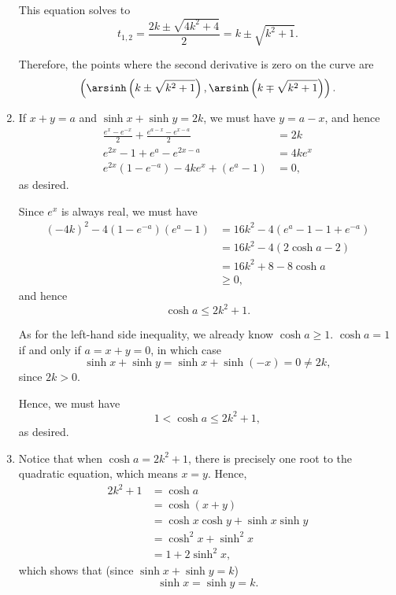 \begin{enumerate}
          This equation solves to
          \[
              t_{1, 2} = \frac{2k \pm \sqrt{4k^2 + 4}}{2} = k \pm \sqrt{k^2 + 1}.
          \]

          Therefore, the points where the second derivative is zero on the curve are
          \[
              \left(\arsinh \left(k \pm \sqrt{k^2 + 1}\right), \arsinh \left(k \mp \sqrt{k^2 + 1}\right)\right).
          \]

    \item If \(x + y = a\) and \(\sinh x + \sinh y = 2k\), we must have \(y = a - x\), and hence
          \begin{align*}
              \frac{e^x - e^{-x}}{2} + \frac{e^{a - x} - e^{x - a}}{2} & = 2k       \\
              e^{2x} - 1 + e^a - e^{2x - a}                            & = 4k e^{x} \\
              e^{2x} (1 - e^{-a}) - 4k e^{x} + (e^a - 1)               & = 0,
          \end{align*}
          as desired.

          Since \(e^x\) is always real, we must have
          \begin{align*}
              (-4k)^2 - 4 (1 - e^{-a})(e^a - 1) & = 16k^2 - 4 (e^a - 1 - 1 + e^{-a}) \\
                                                & = 16k^2 - 4 (2 \cosh a - 2)        \\
                                                & = 16k^2 + 8 - 8 \cosh a            \\
                                                & \geq 0,
          \end{align*}
          and hence
          \[
              \cosh a \leq 2k^2 + 1.
          \]

          As for the left-hand side inequality, we already know \(\cosh a \geq 1\). \(\cosh a = 1\) if and only if \(a = x + y = 0\), in which case
          \[
              \sinh x + \sinh y = \sinh x + \sinh (-x) = 0 \neq 2k,
          \]
          since \(2k > 0\).

          Hence, we must have
          \[
              1 < \cosh a \leq 2k^2 + 1,
          \]
          as desired.

    \item Notice that when \(\cosh a = 2k^2 + 1\), there is precisely one root to the quadratic equation, which means \(x = y\). Hence,
          \begin{align*}
              2k^2 + 1 & = \cosh a                           \\
                       & = \cosh (x + y)                     \\
                       & = \cosh x \cosh y + \sinh x \sinh y \\
                       & = \cosh^2 x + \sinh^2 x             \\
                       & = 1 + 2 \sinh^2 x,
          \end{align*}
          which shows that (since \(\sinh x + \sinh y = k\))
          \[
              \sinh x = \sinh y = k.
          \]


\end{enumerate}
